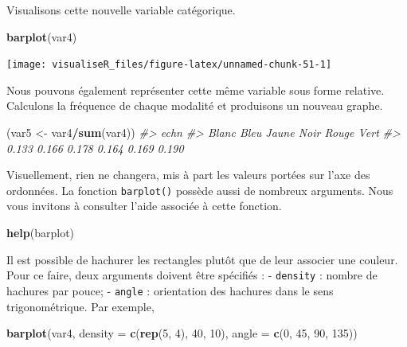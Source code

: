 \documentclass[]{article}
\newenvironment{Shaded}{\begin{snugshade}}{\end{snugshade}}
\newcommand{\CommentTok}[1]{\textcolor[rgb]{0.56,0.35,0.01}{\textit{#1}}}
\newcommand{\DataTypeTok}[1]{\textcolor[rgb]{0.13,0.29,0.53}{#1}}
\newcommand{\DecValTok}[1]{\textcolor[rgb]{0.00,0.00,0.81}{#1}}
\newcommand{\KeywordTok}[1]{\textcolor[rgb]{0.13,0.29,0.53}{\textbf{#1}}}
\newcommand{\NormalTok}[1]{#1}
\newcommand{\OperatorTok}[1]{\textcolor[rgb]{0.81,0.36,0.00}{\textbf{#1}}}
\newcommand{\StringTok}[1]{\textcolor[rgb]{0.31,0.60,0.02}{#1}}
\begin{document}
Visualisons cette nouvelle variable catégorique.

\begin{Shaded}
\begin{Highlighting}[]
\KeywordTok{barplot}\NormalTok{(var4)}
\end{Highlighting}
\end{Shaded}

\begin{center}\texttt{[image: visualiseR\_files/figure-latex/unnamed-chunk-51-1]} \end{center}

Nous pouvons également représenter cette même variable sous forme relative. Calculons la fréquence de chaque modalité et produisons un nouveau graphe.

\begin{Shaded}
\begin{Highlighting}[]
\NormalTok{(var5 <-}\StringTok{ }\NormalTok{var4}\OperatorTok{/}\KeywordTok{sum}\NormalTok{(var4))}
\CommentTok{#> echn}
\CommentTok{#> Blanc  Bleu Jaune  Noir Rouge  Vert }
\CommentTok{#> 0.133 0.166 0.178 0.164 0.169 0.190}
\end{Highlighting}
\end{Shaded}

Visuellement, rien ne changera, mis à part les valeurs portées sur l'axe des ordonnées. La fonction \texttt{barplot()} possède aussi de nombreux arguments. Nous vous invitons à consulter l'aide associée à cette fonction.

\begin{Shaded}
\begin{Highlighting}[]
\KeywordTok{help}\NormalTok{(barplot)}
\end{Highlighting}
\end{Shaded}

Il est possible de hachurer les rectangles plutôt que de leur associer une couleur. Pour ce faire, deux arguments doivent être spécifiés :
- \texttt{density} : nombre de hachures par pouce;
- \texttt{angle} : orientation des hachures dans le sens trigonométrique.
Par exemple,

\begin{Shaded}
\begin{Highlighting}[]
\KeywordTok{barplot}\NormalTok{(var4, }\DataTypeTok{density =} \KeywordTok{c}\NormalTok{(}\KeywordTok{rep}\NormalTok{(}\DecValTok{5}\NormalTok{, }\DecValTok{4}\NormalTok{), }\DecValTok{40}\NormalTok{, }\DecValTok{10}\NormalTok{), }\DataTypeTok{angle =} \KeywordTok{c}\NormalTok{(}\DecValTok{0}\NormalTok{, }\DecValTok{45}\NormalTok{, }\DecValTok{90}\NormalTok{, }\DecValTok{135}\NormalTok{))}
\end{Highlighting}
\end{Shaded}
\end{document}

